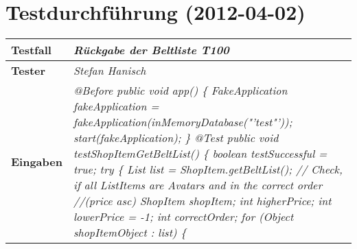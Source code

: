 
\chapter{Testdurchführung (2012-04-02)}

\begin{longtable}{|p{4cm}|p{11cm}|}
\hline
\textbf{Testfall} & \textit{Rückgabe der Beltliste \textbf{T100}} \\
\hline
\textbf{Tester} & \textit{Stefan Hanisch} \\
\hline
\textbf{Eingaben} & \textit{@Before \newline
public void app() \{ \newline
\hspace*{1mm}FakeApplication fakeApplication \newline
\hspace*{4mm}= fakeApplication(inMemoryDatabase("'test"'));\newline
\hspace*{1mm}start(fakeApplication); \newline
\} \newline
\newline
@Test \newline
public void testShopItemGetBeltList() \{\newline
\hspace*{1mm}boolean testSuccessful = true; \newline
\hspace*{1mm}try \{\newline
\hspace*{3mm}List list = ShopItem.getBeltList();\newline
\hspace*{3mm}// Check, if all ListItems are Avatars and in the correct order \newline
\hspace*{3mm}//(price asc) \newline
\hspace*{3mm}ShopItem shopItem; \newline
\hspace*{3mm}int higherPrice; \newline
\hspace*{3mm}int lowerPrice = -1;\newline
\hspace*{3mm}int correctOrder;\newline
\hspace*{3mm}for (Object shopItemObject : list) \{\newline
}
\end{longtable}

